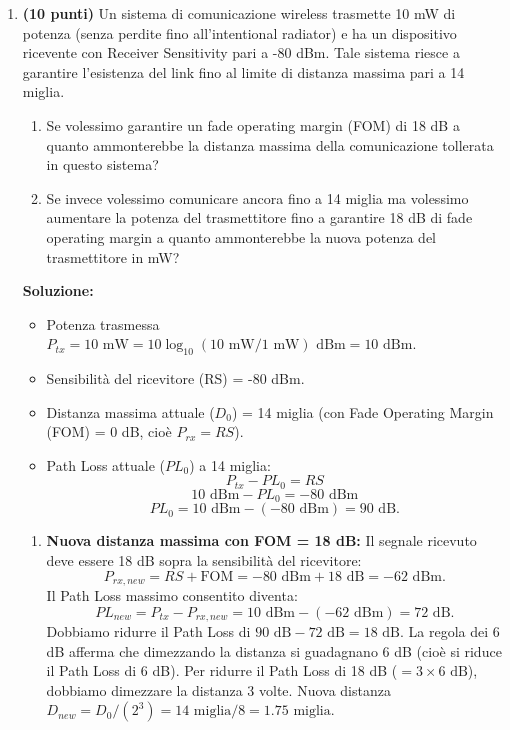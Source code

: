 \documentclass[12pt,a4paper]{article}
\begin{document}
\begin{enumerate}[label=\textbf{\arabic*.}, wide, labelindent=0pt, leftmargin=*]
    \item \textbf{(10 punti)} Un sistema di comunicazione wireless trasmette 10 mW di potenza (senza perdite fino all'intentional radiator) e ha un dispositivo ricevente con Receiver Sensitivity pari a -80 dBm. Tale sistema riesce a garantire l'esistenza del link fino al limite di distanza massima pari a 14 miglia.
    \begin{enumerate}[label=\alph*)]
        \item Se volessimo garantire un fade operating margin (FOM) di 18 dB a quanto ammonterebbe la distanza massima della comunicazione tollerata in questo sistema?
        \item Se invece volessimo comunicare ancora fino a 14 miglia ma volessimo aumentare la potenza del trasmettitore fino a garantire 18 dB di fade operating margin a quanto ammonterebbe la nuova potenza del trasmettitore in mW?
    \end{enumerate}
    \textbf{Soluzione:}
    \begin{itemize}
        \item Potenza trasmessa $P_{tx} = 10 \text{ mW} = 10 \log_{10}(10 \text{ mW} / 1 \text{ mW}) \text{ dBm} = 10 \text{ dBm}$.
        \item Sensibilità del ricevitore (RS) = -80 dBm.
        \item Distanza massima attuale ($D_0$) = 14 miglia (con Fade Operating Margin (FOM) = 0 dB, cioè $P_{rx} = RS$).
        \item Path Loss attuale ($PL_0$) a 14 miglia:
        \[ P_{tx} - PL_0 = RS \]
        \[ 10 \text{ dBm} - PL_0 = -80 \text{ dBm} \]
        \[ PL_0 = 10 \text{ dBm} - (-80 \text{ dBm}) = 90 \text{ dB}. \]
    \end{itemize}
    \begin{enumerate}[label=\alph*), wide, labelindent=0pt, leftmargin=*]
        \item \textbf{Nuova distanza massima con FOM = 18 dB:}
        Il segnale ricevuto deve essere 18 dB sopra la sensibilità del ricevitore:
        \[ P_{rx,new} = RS + \text{FOM} = -80 \text{ dBm} + 18 \text{ dB} = -62 \text{ dBm}. \]
        Il Path Loss massimo consentito diventa:
        \[ PL_{new} = P_{tx} - P_{rx,new} = 10 \text{ dBm} - (-62 \text{ dBm}) = 72 \text{ dB}. \]
        Dobbiamo ridurre il Path Loss di $90 \text{ dB} - 72 \text{ dB} = 18 \text{ dB}$.
        La regola dei 6 dB afferma che dimezzando la distanza si guadagnano 6 dB (cioè si riduce il Path Loss di 6 dB).
        Per ridurre il Path Loss di 18 dB ($= 3 \times 6 \text{ dB}$), dobbiamo dimezzare la distanza 3 volte.
        Nuova distanza $D_{new} = D_0 / (2^3) = 14 \text{ miglia} / 8 = 1.75 \text{ miglia}$.


\end{enumerate}
\end{enumerate}
\end{document}
